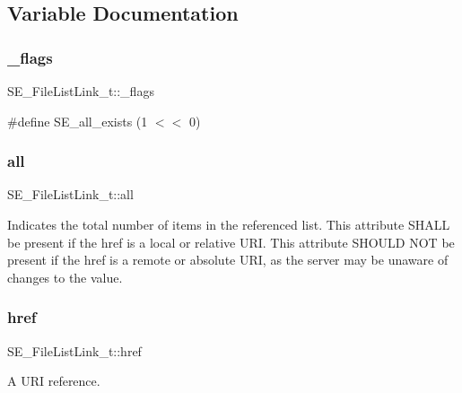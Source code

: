 \subsection{Variable Documentation}
\mbox{\label{group__FileListLink_gaced91cb9594ebae572e6a7216179d24d}} 
\subsubsection{\texorpdfstring{\+\_\+flags}{\_flags}}
{\footnotesize\ttfamily S\+E\+\_\+\+File\+List\+Link\+\_\+t\+::\+\_\+flags}

\#define S\+E\+\_\+all\+\_\+exists (1 $<$$<$ 0) \mbox{\label{group__FileListLink_ga29b8ccd48909ecad5f8c9f14eacafe2c}} 
\subsubsection{\texorpdfstring{all}{all}}
{\footnotesize\ttfamily S\+E\+\_\+\+File\+List\+Link\+\_\+t\+::all}

Indicates the total number of items in the referenced list. This attribute S\+H\+A\+LL be present if the href is a local or relative U\+RI. This attribute S\+H\+O\+U\+LD N\+OT be present if the href is a remote or absolute U\+RI, as the server may be unaware of changes to the value. \mbox{\label{group__FileListLink_ga031e60ab342d2ccd4ac921fd30ffb9b1}} 
\subsubsection{\texorpdfstring{href}{href}}
{\footnotesize\ttfamily S\+E\+\_\+\+File\+List\+Link\+\_\+t\+::href}

A U\+RI reference. 